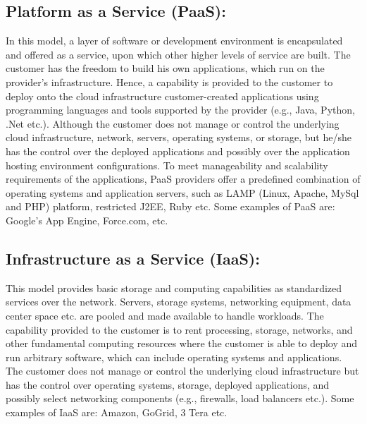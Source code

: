 \documentclass[11pt,a4paper]{report}
\begin{document}
\subsection{Platform as a Service (PaaS):}
In this model, a layer of software or development environment is
encapsulated and offered as a service, upon which other higher levels of service are built. The customer
has the freedom to build his own applications, which run on the provider’s infrastructure. Hence, a
capability is provided to the customer to deploy onto the cloud infrastructure customer-created
applications using programming languages and tools supported by the provider (e.g., Java, Python, .Net
etc.). Although the customer does not manage or control the underlying cloud infrastructure, network,
servers, operating systems, or storage, but he/she has the control over the deployed applications and
possibly over the application hosting environment configurations. To meet manageability and scalability
requirements of the applications, PaaS providers offer a predefined combination of operating systems and
application servers, such as LAMP (Linux, Apache, MySql and PHP) platform, restricted J2EE, Ruby etc.
Some examples of PaaS are: Google’s App Engine, Force.com, etc.
\subsection{Infrastructure as a Service (IaaS):}
This model provides basic storage and computing capabilities as
standardized services over the network. Servers, storage systems, networking equipment, data center
space etc. are pooled and made available to handle workloads. The capability provided to the customer is
to rent processing, storage, networks, and other fundamental computing resources where the customer is
able to deploy and run arbitrary software, which can include operating systems and applications. The
customer does not manage or control the underlying cloud infrastructure but has the control over
operating systems, storage, deployed applications, and possibly select networking components (e.g.,
firewalls, load balancers etc.). Some examples of IaaS are: Amazon, GoGrid, 3 Tera etc.\\
\end{document}
